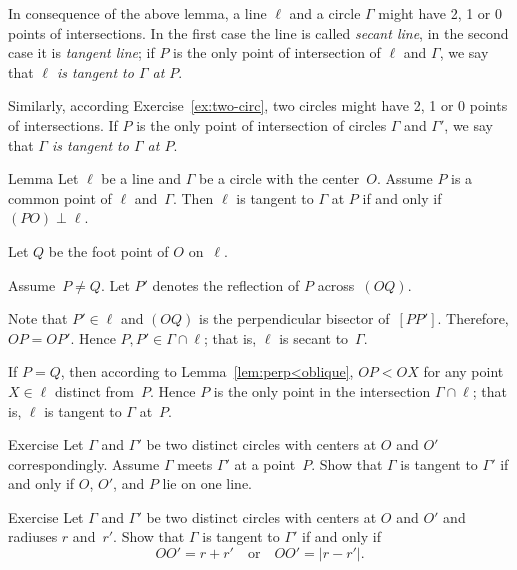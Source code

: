 In consequence of the above lemma, 
a line $\ell$ and a circle $\Gamma$ might have 2, 1 or 0 points of intersections.
In the first case the line is called \emph{secant line}, in the second case it is \emph{tangent line};
if $P$ is the only point of intersection of $\ell$ and $\Gamma$,
we say that {}\emph{$\ell$ is tangent to $\Gamma$ at $P$}. 

Similarly, according Exercise~\ref{ex:two-circ},
two circles might have 2, 1 or 0 points of intersections.
If $P$ is the only point of intersection of circles $\Gamma$ and $\Gamma'$,
we say that \emph{$\Gamma$ is tangent to $\Gamma$ at $P$}. 

\begin{thm}[\abs]{Lemma}\label{lem:tangent}
Let $\ell$ be a line and $\Gamma$ be a circle with the center~$O$.
Assume $P$ is a common point of $\ell$ and~$\Gamma$. 
Then $\ell$ is tangent to $\Gamma$ at $P$ if and only if $(PO)\perp \ell$.
\end{thm}

Let $Q$ be the foot point of $O$ on~$\ell$.

Assume~$P\ne Q$.
Let $P'$ denotes the reflection of $P$ across~$(OQ)$.

Note that $P'\in\ell$ and $(OQ)$ is the perpendicular bisector of~$[PP']$.
Therefore, $OP=OP'$.
Hence $P,P'\in \Gamma\cap \ell$;
that is, $\ell$ is secant to~$\Gamma$.

If $P=Q$, 
then according to Lemma~\ref{lem:perp<oblique},
$OP<OX$ for any point $X\in \ell$ distinct from~$P$.
Hence $P$ is the only point in the intersection $\Gamma\cap\ell$;
that is, $\ell$ is tangent to $\Gamma$ at~$P$. 
\qeds

\begin{thm}{Exercise}\label{ex:tangent-circles}
Let $\Gamma$ and $\Gamma'$ be two distinct circles with centers at $O$ and $O'$ correspondingly. 
Assume $\Gamma$ meets $\Gamma'$ at a point~$P$.
Show that $\Gamma$ is tangent to $\Gamma'$ if and only if $O$, $O'$, and $P$ lie on one line.
\end{thm}

\begin{thm}{Exercise}\label{ex:tangent-circles-2}
Let $\Gamma$ and $\Gamma'$ be two distinct circles with centers at $O$ and $O'$ and radiuses $r$ and~$r'$.
Show that $\Gamma$ is tangent to $\Gamma'$ if and only if
$$OO'=r+r'
\quad
\text{or}\quad
OO'=|r-r'|.$$

\end{thm}

